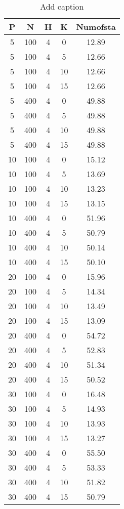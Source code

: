 \begin{table}[htbp]
  \centering
  \caption{Add caption}
    \begin{tabular}{ccccc}
    \toprule
    P     & N     & H     & K     & Numofsta \\
    \midrule
    5     & 100   & 4     & 0     & 12.89  \\
    5     & 100   & 4     & 5     & 12.66  \\
    5     & 100   & 4     & 10    & 12.66  \\
    5     & 100   & 4     & 15    & 12.66  \\
    5     & 400   & 4     & 0     & 49.88  \\
    5     & 400   & 4     & 5     & 49.88  \\
    5     & 400   & 4     & 10    & 49.88  \\
    5     & 400   & 4     & 15    & 49.88  \\
    10    & 100   & 4     & 0     & 15.12  \\
    10    & 100   & 4     & 5     & 13.69  \\
    10    & 100   & 4     & 10    & 13.23  \\
    10    & 100   & 4     & 15    & 13.15  \\
    10    & 400   & 4     & 0     & 51.96  \\
    10    & 400   & 4     & 5     & 50.79  \\
    10    & 400   & 4     & 10    & 50.14  \\
    10    & 400   & 4     & 15    & 50.10  \\
    20    & 100   & 4     & 0     & 15.96  \\
    20    & 100   & 4     & 5     & 14.34  \\
    20    & 100   & 4     & 10    & 13.49  \\
    20    & 100   & 4     & 15    & 13.09  \\
    20    & 400   & 4     & 0     & 54.72  \\
    20    & 400   & 4     & 5     & 52.83  \\
    20    & 400   & 4     & 10    & 51.34  \\
    20    & 400   & 4     & 15    & 50.52  \\
    30    & 100   & 4     & 0     & 16.48  \\
    30    & 100   & 4     & 5     & 14.93  \\
    30    & 100   & 4     & 10    & 13.93  \\
    30    & 100   & 4     & 15    & 13.27  \\
    30    & 400   & 4     & 0     & 55.50  \\
    30    & 400   & 4     & 5     & 53.33  \\
    30    & 400   & 4     & 10    & 51.82  \\
    30    & 400   & 4     & 15    & 50.79  \\
    \bottomrule
    \end{tabular}%
  \label{tab:addlabel}%
\end{table}%
